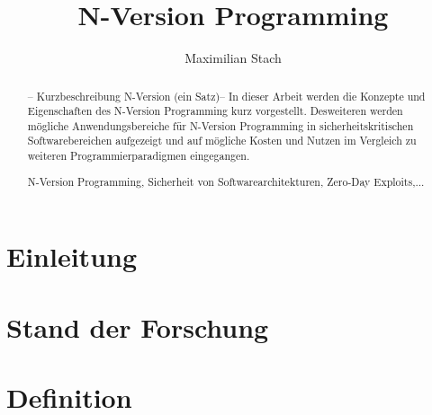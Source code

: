 \documentclass[runningheads,a4paper]{llncs}
\newcommand{\keywords}[1]{\par\addvspace\baselineskip
\noindent\keywordname\enspace\ignorespaces#1}
\begin{document}
\mainmatter  %

\title{N-Version Programming}



\author{Maximilian Stach}
%




\maketitle


\begin{abstract}
	-- Kurzbeschreibung N-Version (ein Satz)--
In dieser Arbeit werden die Konzepte und Eigenschaften des N-Version Programming kurz vorgestellt. Desweiteren werden mögliche Anwendungsbereiche für N-Version Programming in sicherheitskritischen Softwarebereichen aufgezeigt und auf mögliche Kosten und Nutzen im Vergleich zu weiteren Programmierparadigmen eingegangen.
\keywords{N-Version Programming, Sicherheit von Softwarearchitekturen, Zero-Day Exploits,...}
\end{abstract}
\tableofcontents

\cleardoublepage

\section{Einleitung} \label{einleitung}



\section{Stand der Forschung} \label{stand}



\section{Definition} \label{definition}

\end{document}
